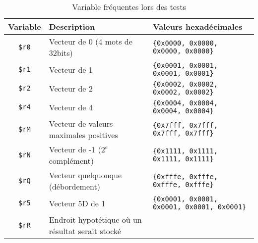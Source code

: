 \documentclass[a11paper]{article}
\begin{document}
\begin{table}[H]
	\centering
	\footnotesize
	\caption{Variable fréquentes lors des tests}
	\label{tab:vars}
	\begin{tabular}{@{}cp{5.5cm}l@{}}
		\toprule
		\textbf{Variable} & \textbf{Description}                             & \textbf{Valeurs hexadécimales}                  \\
		\midrule
		\verb|$r0|        & Vecteur de 0 (4 mots de 32bits)                  & \verb|{0x0000, 0x0000, 0x0000, 0x0000}|         \\
		\verb|$r1|        & Vecteur de 1                                     & \verb|{0x0001, 0x0001, 0x0001, 0x0001}|         \\
		\verb|$r2|        & Vecteur de 2                                     & \verb|{0x0002, 0x0002, 0x0002, 0x0002}|         \\
		\verb|$r4|        & Vecteur de 4                                     & \verb|{0x0004, 0x0004, 0x0004, 0x0004}|         \\
		\verb|$rM|        & Vecteur de valeurs maximales positives           & \verb|{0x7fff, 0x7fff, 0x7fff, 0x7fff}|         \\
		\verb|$rN|        & Vecteur de -1 ($2^e$ complément)                 & \verb|{0x1111, 0x1111, 0x1111, 0x1111}|         \\
		\verb|$rQ|        & Vecteur quelquonque (débordement)                & \verb|{0xfffe, 0xfffe, 0xfffe, 0xfffe}|         \\
		\verb|$r5|        & Vecteur 5D de 1                                  & \verb|{0x0001, 0x0001, 0x0001, 0x0001, 0x0001}| \\
		\verb|$rR|        & Endroit hypotétique où un résultat serait stocké &                                                 \\
		\bottomrule
	\end{tabular}
\end{table}
\end{document}

